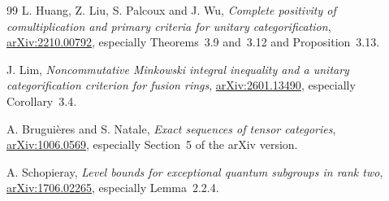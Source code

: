 \begin{thebibliography}{99}
L. Huang, Z. Liu, S. Palcoux and J. Wu,
\emph{Complete positivity of comultiplication and primary criteria for
unitary categorification},
\href{https://arxiv.org/abs/2210.00792}{arXiv:2210.00792},
especially Theorems~3.9 and~3.12 and Proposition~3.13.

J. Lim,
\emph{Noncommutative Minkowski integral inequality and a unitary
categorification criterion for fusion rings},
\href{https://arxiv.org/abs/2601.13490}{arXiv:2601.13490},
especially Corollary~3.4.

A. Brugui\`eres and S. Natale,
\emph{Exact sequences of tensor categories},
\href{https://arxiv.org/abs/1006.0569}{arXiv:1006.0569},
especially Section~5 of the arXiv version.

A. Schopieray,
\emph{Level bounds for exceptional quantum subgroups in rank two},
\href{https://arxiv.org/abs/1706.02265}{arXiv:1706.02265},
especially Lemma~2.2.4.

\end{thebibliography}
